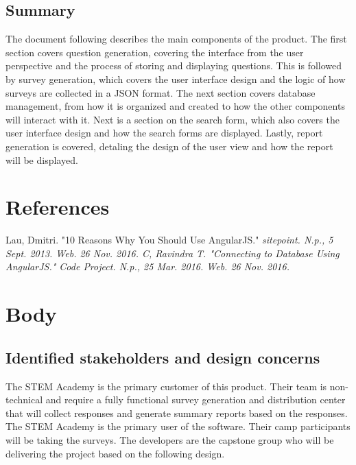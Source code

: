 \subsection{Summary}
The document following describes the main components of the product.
The first section covers question generation, covering the interface from the user perspective and the process of storing and displaying questions.
This is followed by survey generation, which covers the user interface design and the logic of how surveys are collected in a JSON format.
The next section covers database management, from how it is organized and created to how the other components will interact with it.
Next is a section on the search form, which also covers the user interface design and how the search forms are displayed.
Lastly, report generation is covered, detaling the design of the user view and how the report will be displayed.

\section{References}

\begin{thebibliography}{2}

 Lau, Dmitri. "10 Reasons Why You Should Use AngularJS." \em{sitepoint}. N.p., 5 Sept. 2013. Web. 26 Nov. 2016.
 C, Ravindra T. "Connecting to Database Using AngularJS." \em{Code Project}. N.p., 25 Mar. 2016. Web. 26 Nov. 2016.

\end{thebibliography}

\section{Body}
\subsection{Identified stakeholders and design concerns}
The STEM Academy is the primary customer of this product. Their team is non-technical and require a fully functional survey generation and distribution center that will collect responses and generate summary reports based on the responses. The STEM Academy is the primary user of the software. Their camp participants will be taking the surveys. The developers are the capstone 
group who will be delivering the project based on the following design.

